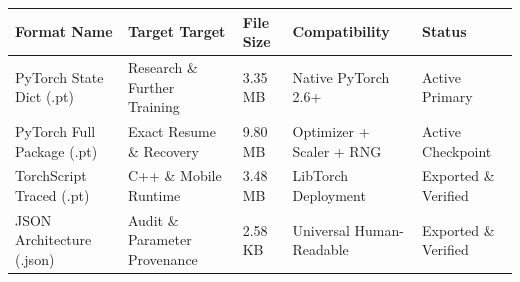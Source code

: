 \begin{tabular}{lllll}
\toprule
Format Name & Target Target & File Size & Compatibility & Status \\
\midrule
PyTorch State Dict (.pt) & Research \& Further Training & 3.35 MB & Native PyTorch 2.6+ & Active Primary \\
PyTorch Full Package (.pt) & Exact Resume \& Recovery & 9.80 MB & Optimizer + Scaler + RNG & Active Checkpoint \\
TorchScript Traced (.pt) & C++ \& Mobile Runtime & 3.48 MB & LibTorch Deployment & Exported \& Verified \\
JSON Architecture (.json) & Audit \& Parameter Provenance & 2.58 KB & Universal Human-Readable & Exported \& Verified \\
\bottomrule
\end{tabular}
